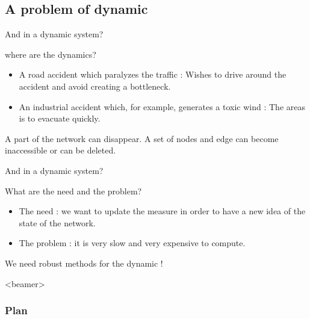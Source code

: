 \documentclass{beamer}
\begin{document}
	\subsection{A problem of dynamic}
	
\begin{frame}{And in a dynamic system?}
	\begin{block}{where are the dynamics?}
		\begin{itemize}
			\item A road accident which paralyzes the traffic : Wishes to drive around the accident and avoid creating a bottleneck.
			\item An industrial accident which, for example, generates a toxic wind : The areas is to evacuate quickly.
		\end{itemize}
		A part of the network can disappear. A set of nodes and edge can become inaccessible or can be deleted.
	\end{block}
\end{frame}

\begin{frame}{And in a dynamic system?}
	\begin{block}{What are the need and the problem?}
		\begin{itemize}
			\item The need : we want to update the measure in order to have a new idea of the state of the network.
			\item The problem : it is very slow and very expensive to compute.
		\end{itemize}
	\end{block}
\end{frame}

\begin{frame}
	\begin{center}
		We need robust methods for the dynamic !
	\end{center}
\end{frame}

\begin{frame}<beamer>
    \frametitle{Plan}
		\begin{columns}[t]
			\begin{column}{5cm}
				\tableofcontents[sections={1-2}]
			\end{column}
			\begin{column}{5cm}
				\tableofcontents[sections={3-5}]
			\end{column}
		\end{columns}
\end{frame}
\end{document}
